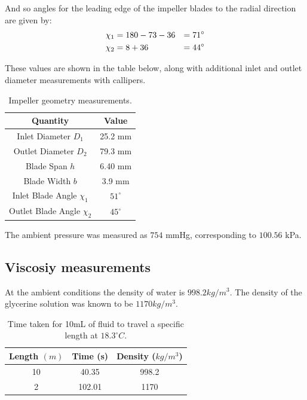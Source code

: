 \documentclass{article}
\begin{document}
And so angles for the leading edge of the impeller blades to the radial direction are given by:
\begin{alignat}{2}
    \chi_1 &= 180-73-36 &= 71^\circ \notag \\
    \chi_2 &= 8 + 36 &= 44^\circ \notag
\end{alignat}

These values are shown in the table below, along with additional inlet and outlet diameter measurements with callipers.

\begin{table}[H]
    \centering
    \begin{tabular}{|c|c|}
        \hline
        \textbf{Quantity} & \textbf{Value} \\
        \hline
        Inlet Diameter $D_1$ & 25.2 mm \\
        Outlet Diameter $D_2$ & 79.3 mm \\
        Blade Span $h$ & 6.40 mm \\
        Blade Width $b$ & 3.9 mm \\
        Inlet Blade Angle $\chi_1$ & $51^\circ$ \\
        Outlet Blade Angle $\chi_2$ & $45^\circ$ \\
        \hline
    \end{tabular}
    \caption{Impeller geometry measurements.}
    \label{tab:impeller_geometry}
\end{table}

The ambient pressure was measured as $754$ mmHg, corresponding to $100.56$ kPa.

\subsection{Viscosiy measurements}

At the ambient conditions the density of water is $998.2 kg/m^3$.
The density of the glycerine solution was known to be $1170 kg/m^3$.

\begin{table}[H]
    \centering
    \begin{tabular}{|c|c|c|}
        \hline
        \textbf{Length} $(m)$ & \textbf{Time} (s) & \textbf{Density} ($kg/m^3$) \\
        \hline
        10 & 40.35 & 998.2 \\
        2 & 102.01 & 1170 \\
        \hline
    \end{tabular}
    \caption{Time taken for 10mL of fluid to travel a specific length at $18.3^\circ C.$}
    \label{tab:viscosity}
\end{table}
\end{document}
